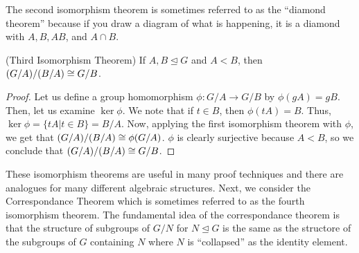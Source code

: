 \documentclass[11pt,leqno,oneside]{amsart}
\newcommand{\subgroup}{\mathrel{<}}
\newcommand{\normsubgroup}{\mathrel{\unlhd}}
\begin{document}
The second isomorphism theorem is sometimes referred to as the ``diamond
theorem'' because if you draw a diagram of what is happening, it is a diamond
with $A, B, AB$, and $A \cap B$.
\begin{cor}
    (Third Isomorphism Theorem) If $A,B \normsubgroup G$ and $A \subgroup B$, then $(G/A)/(B/A) \mathrel{\cong} G/B$.
\end{cor}
\begin{proof}
    Let us define a group homomorphism $\phi: G/A \to G/B$ by $\phi(gA) = gB$.
    Then, let us examine $\ker \phi$. We note that if $t \in B$,
    then $\phi(tA) = B$. Thus, $\ker \phi = \{tA | t \in B\} = B/A$. Now, applying the first
    isomorphism theorem with $\phi$, we get that $(G/A)/(B/A) \mathrel{\cong} \phi(G/A)$.
    $\phi$ is clearly surjective because $A \subgroup B$, so we conclude that
    $(G/A)/(B/A) \mathrel{\cong} G/B$.
\end{proof}

These isomorphism theorems are useful in many proof techniques and there are
analogues for many different algebraic structures. Next, we consider the
Correspondance Theorem which is sometimes referred to as the fourth isomorphism
theorem. The fundamental idea of the correspondance theorem is that the
structure of subgroups of $G/N$ for $N \normsubgroup G$ is the same as the
structore of the subgroups of $G$ containing $N$ where $N$ is ``collapsed'' as
the identity element.
\end{document}
